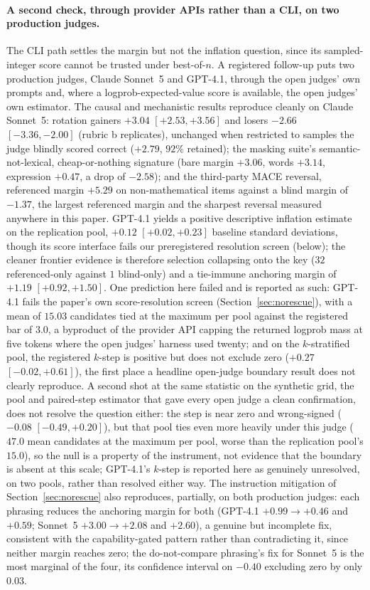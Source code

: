 \documentclass[11pt]{article}
\begin{document}
\paragraph{A second check, through provider APIs rather than a CLI, on two production judges.}
The CLI path settles the margin but not the inflation question, since its sampled-integer score cannot be trusted under best-of-$n$.
A registered follow-up puts two production judges, Claude Sonnet~5 and GPT-4.1, through the open judges' own prompts and, where a logprob-expected-value score is available, the open judges' own estimator.
The causal and mechanistic results reproduce cleanly on Claude Sonnet~5: rotation gainers $+3.04$ $[+2.53,+3.56]$ and losers $-2.66$ $[-3.36,-2.00]$ (rubric b replicates), unchanged when restricted to samples the judge blindly scored correct ($+2.79$, $92\%$ retained); the masking suite's semantic-not-lexical, cheap-or-nothing signature (bare margin $+3.06$, words $+3.14$, expression $+0.47$, a drop of $-2.58$); and the third-party MACE reversal, referenced margin $+5.29$ on non-mathematical items against a blind margin of $-1.37$, the largest referenced margin and the sharpest reversal measured anywhere in this paper.
GPT-4.1 yields a positive descriptive inflation estimate on the replication pool, $+0.12$ $[+0.02,+0.23]$ baseline standard deviations, though its score interface fails our preregistered resolution screen (below); the cleaner frontier evidence is therefore selection collapsing onto the key ($32$ referenced-only against $1$ blind-only) and a tie-immune anchoring margin of $+1.19$ $[+0.92,+1.50]$.
One prediction here failed and is reported as such: GPT-4.1 fails the paper's own score-resolution screen (Section~\ref{sec:norescue}), with a mean of $15.03$ candidates tied at the maximum per pool against the registered bar of $3.0$, a byproduct of the provider API capping the returned logprob mass at five tokens where the open judges' harness used twenty; and on the $k$-stratified pool, the registered $k$-step is positive but does not exclude zero ($+0.27$ $[-0.02,+0.61]$), the first place a headline open-judge boundary result does not clearly reproduce.
A second shot at the same statistic on the synthetic grid, the pool and paired-step estimator that gave every open judge a clean confirmation, does not resolve the question either: the step is near zero and wrong-signed ($-0.08$ $[-0.49,+0.20]$), but that pool ties even more heavily under this judge ($47.0$ mean candidates at the maximum per pool, worse than the replication pool's $15.0$), so the null is a property of the instrument, not evidence that the boundary is absent at this scale; GPT-4.1's $k$-step is reported here as genuinely unresolved, on two pools, rather than resolved either way.
The instruction mitigation of Section~\ref{sec:norescue} also reproduces, partially, on both production judges: each phrasing reduces the anchoring margin for both (GPT-4.1 $+0.99 \to +0.46$ and $+0.59$; Sonnet~5 $+3.00 \to +2.08$ and $+2.60$), a genuine but incomplete fix, consistent with the capability-gated pattern rather than contradicting it, since neither margin reaches zero; the do-not-compare phrasing's fix for Sonnet~5 is the most marginal of the four, its confidence interval on $-0.40$ excluding zero by only $0.03$.
\end{document}
